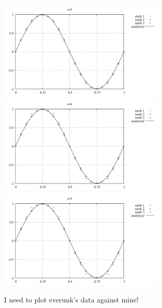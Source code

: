 \begin{center}
\includegraphics[width=8cm]{python_codes/fieldstone_164/results/u_5.pdf}\\
\includegraphics[width=8cm]{python_codes/fieldstone_164/results/u_6.pdf}
\includegraphics[width=8cm]{python_codes/fieldstone_164/results/u_7.pdf}
\end{center}

I need to plot everunk's data against mine!

